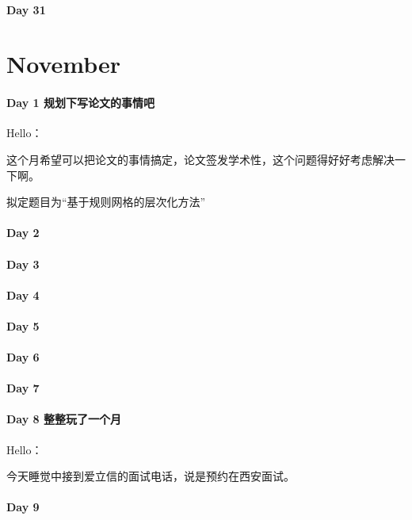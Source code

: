 \documentclass[UTF8,a4paper,8pt]{ctexart}
\begin{document}
 	 \paragraph{Day 31      \quad     }
 \section{November}
 	 \paragraph{Day 1   规划下写论文的事情吧    \quad     }
	 	 Hello：
	 	 
	 	 这个月希望可以把论文的事情搞定，论文签发学术性，这个问题得好好考虑解决一下啊。
	 	 
	 	 拟定题目为“基于规则网格的层次化方法”
	 	 
	 	 
 	 \paragraph{Day 2       \quad     }
 	 \paragraph{Day 3       \quad     }
 	 \paragraph{Day 4       \quad     }
 	 \paragraph{Day 5       \quad     }
 	 \paragraph{Day 6       \quad     }
 	 \paragraph{Day 7       \quad     }
 	 \paragraph{Day 8   整整玩了一个月    \quad     }
	 	 Hello：
	 	 
	 	 今天睡觉中接到爱立信的面试电话，说是预约在西安面试。
	 	 
 	 \paragraph{Day 9       \quad     }
	 	  
\end{document}
